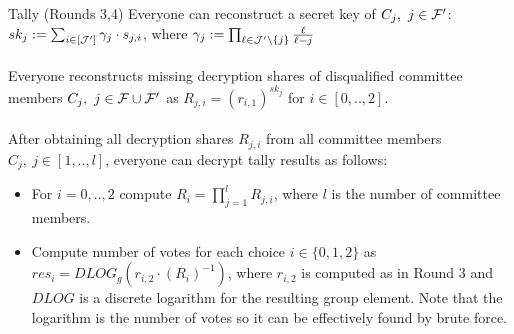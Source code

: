 \begin{boxfig}{\label{fig:tally2}Tally (Rounds 3,4)}{}
Everyone can reconstruct a secret key of $C_j,\ j\in\mathcal{F}'$: $sk_j := \sum_{i\in[\mathcal{J}']} \gamma_{j} \cdot s_{j,i}$, where $\gamma_{j}:= \prod_{\ell\in \mathcal{J}'\setminus \{j\} } \frac{\ell}{\ell-j}$\\\\
Everyone reconstructs missing decryption shares of disqualified committee members $C_j,\ j\in\FFF\cup\FFF'$ as $R_{j,i}=(r_{i,1})^{sk_j}$ for $i\in[0,..,2]$.\\\\
After obtaining all decryption shares $R_{j,i}$ from all committee members $C_j,\ j\in[1,..,l]$, everyone can decrypt tally results as follows:
\begin{itemize}
    \item For $i = 0,.., 2$ compute $R_i=\prod_{j=1}^{l} R_{j,i}$, where $l$ is the number of committee members.
    \item Compute number of votes for each choice $i\in\{0,1,2\}$ as $res_{i}=DLOG_g(r_{i,2} \cdot (R_i)^{-1})$, where $r_{i,2}$ is computed as in Round 3 and $DLOG$ is a discrete logarithm for the resulting group element. Note that the logarithm is the number of votes so it can be effectively found by brute force.\\
\end{itemize}
\end{boxfig}

